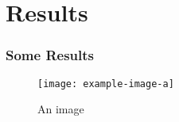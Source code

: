 \section{Results}
\begin{frame}
\frametitle{Some Results}
\begin{figure}[h]
    \centering
    \texttt{[image: example-image-a]}
    \caption{An image}
    \label{fig:mutual_power}
\end{figure}
\end{frame}


